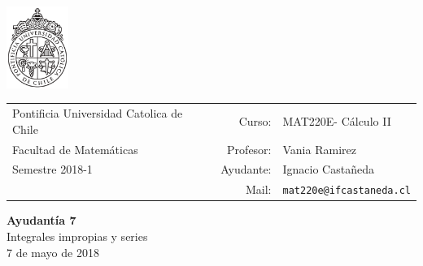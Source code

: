 \documentclass[12pt]{article}
\makeatletter
\newcommand{\ayudantia}{{\sc Ayudantía 7}}
\newcommand{\tituloayu}{Integrales impropias y series}
\newcommand{\fecha}{7 de mayo de 2018}
\newcommand{\sigla}{MAT220E}
\newcommand{\nombre}{Cálculo II}
\newcommand{\profesor}{Vania Ramirez}
\newcommand{\ano}{2018}
\newcommand{\semestre}{1}
\newcommand{\mail}{mat220e@ifcastaneda.cl}
\makeatother
\begin{document}
\thispagestyle{empty}

\begin{minipage}{2cm}
	\includegraphics[width=2cm]{../../../../img/logo.pdf}
	\vspace{0.5cm}
\end{minipage}
\begin{minipage}{\linewidth}
	\begin{tabular}{lrl}
		{\scriptsize\sc Pontificia Universidad Catolica de Chile} & \hspace*{0.7in}Curso: &
		\sigla  - \nombre\\
		{\sc Facultad de Matemáticas}&
		Profesor: & \profesor \\
		{\sc Semestre \ano-\semestre} & Ayudante: & {Ignacio Castañeda}\\
		& {Mail:} & \texttt{\mail}
	\end{tabular}
\end{minipage}

\begin{center}
	{\LARGE\bf \ayudantia}\\
	\vspace{0.1cm}
	{\tituloayu}\\
	\vspace{0.1cm}
	\fecha\\
	\vspace{0.4cm}
\end{center}
\end{document}
